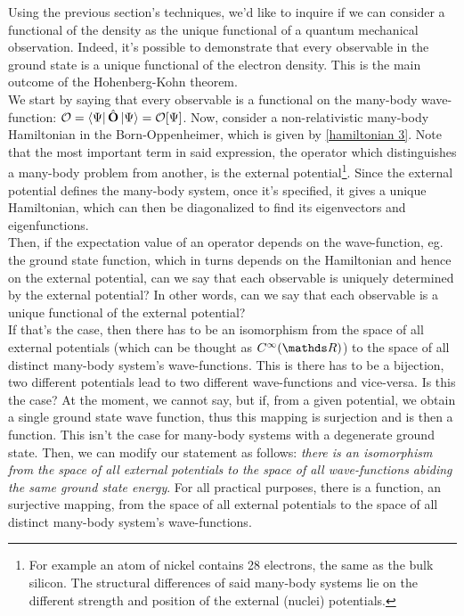 \documentclass{homework}
\begin{document}
Using the previous section's techniques, we'd like to inquire if we can consider a functional of the density as the unique functional of a quantum mechanical observation. Indeed, it's possible to demonstrate that every observable in the ground state is a unique functional of the electron density. This is the main outcome of the Hohenberg-Kohn theorem. \\

We start by saying that every observable is a functional on the many-body wave-function: $\mathcal{O} = \bra{\Psi}\hat{\bf O}\ket{\Psi} = \mathcal{O}[\Psi]$. Now, consider a non-relativistic many-body Hamiltonian in the Born-Oppenheimer, which is given by \eqref{hamiltonian 3}. Note that the most important term in said expression, the operator which distinguishes a many-body problem from another, is the external potential\footnote{For example an atom of nickel contains 28 electrons, the same as the bulk silicon. The structural differences of said many-body systems lie on the different strength and position of the external (nuclei) potentials.}. Since the external potential defines the many-body system, once it's specified, it gives a unique Hamiltonian, which can then be diagonalized to find its eigenvectors and eigenfunctions. \\

Then, if the expectation value of an operator depends on the wave-function, eg. the ground state function, which in turns depends on the Hamiltonian and hence on the external potential, can we say that each observable is uniquely determined by the external potential? In other words, can we say that each observable is a unique functional of the external potential? \\

If that's the case, then there has to be an isomorphism from the space of all external potentials (which can be thought as $C^\infty(\R)$) to the space of all distinct many-body system's wave-functions. This is there has to be a bijection, two different potentials lead to two different wave-functions and vice-versa. Is this the case? At the moment, we cannot say, but if, from a given potential, we obtain a single ground state wave function, thus this mapping is surjection and is then a function. This isn't the case for many-body systems with a degenerate ground state. Then, we can modify our statement as follows: \textit{there is an isomorphism from the space of all external potentials to the space of all wave-functions abiding the same ground state energy}. For all practical purposes, there is a function, an surjective mapping, from the space of all external potentials to the space of all distinct many-body system's wave-functions. \\
\end{document}
